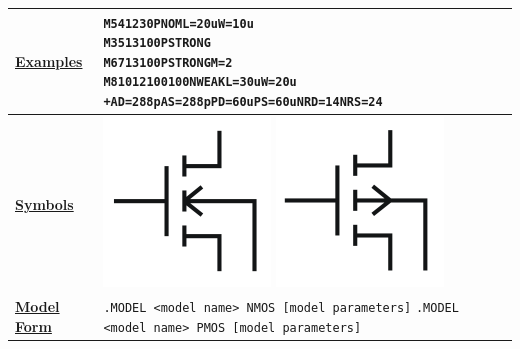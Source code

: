 \begin{longtable}[Hh]{>{\setlength{\hsize}{.4\hsize}}YY}
\underline{\bf Examples} &
\begin{alltt}
M5 4 12 3 0 PNOM L=20u W=10u
M3 5 13 10 0 PSTRONG
M6 7 13 10 0 PSTRONG M=2
M8 10 12 100 100 NWEAK L=30u W=20u
+ AD=288p AS=288p PD=60u PS=60u NRD=14 NRS=24
\end{alltt} \\ \hline

\underline{\bf Symbols} &
{\includegraphics{nmosSymbol}}
{\includegraphics{pmosSymbol}}
\\ \hline

\underline{\bf Model Form} &
\verb|.MODEL <model name> NMOS [model parameters]|
\verb|.MODEL <model name> PMOS [model parameters]|\\ \hline


\end{longtable}
